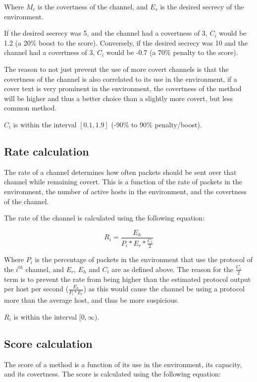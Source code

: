 Where $M_c$ is the covertness of the channel, and $E_s$ is the desired secrecy of the environment.

If the desired secrecy was 5, and the channel had a covertness of 3, $C_i$ would be 1.2 (a 20\% boost to the score). Conversely, if the desired secrecy was 10 and the channel had a covertness of 3, $C_i$ would be -0.7 (a 70\% penalty to the score).

The reason to not just prevent the use of more covert channels is that the covertness of the channel is also correlated to its use in the environment, if a cover text is very prominent in the environment, the covertness of the method will be higher and thus a better choice than a slightly more covert, but less common method.

$C_i$ is within the interval $[0.1, 1.9]$ (-90\% to 90\% penalty/boost).

\subsection{Rate calculation}

The rate of a channel determines how often packets should be sent over that channel while remaining covert. This is a function of the rate of packets in the environment, the number of active hosts in the environment, and the covertness of the channel.

The rate of the channel is calculated using the following equation:

\begin{equation}
    R_i = \frac{E_h}{P_i * E_r * \frac{C_i}{2} }
\end{equation}

Where $P_i$ is the percentage of packets in the environment that use the protocol of the $i^{th}$ channel, and $E_r$, $E_h$ and $C_i$ are as defined above. The reason for the $\frac{C_i}{2}$ term is to prevent the rate from being higher than the estimated protocol output per host per second ($\frac{E_h}{P_i * E_r}$) as this would cause the channel be using a protocol more than the average host, and thus be more suspicious.

$R_i$ is within the interval $[0, \infty)$.

\subsection{Score calculation}

The score of a method is a function of its use in the environment, its capacity, and its covertness.
The score is calculated using the following equation:

